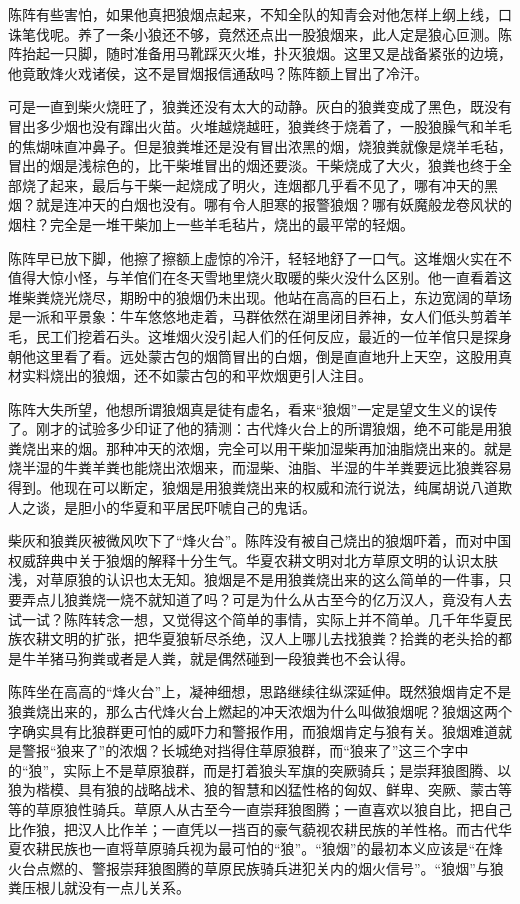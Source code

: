 \par 陈阵有些害怕，如果他真把狼烟点起来，不知全队的知青会对他怎样上纲上线，口诛笔伐呢。养了一条小狼还不够，竟然还点出一股狼烟来，此人定是狼心叵测。陈阵抬起一只脚，随时准备用马靴踩灭火堆，扑灭狼烟。这里又是战备紧张的边境，他竟敢烽火戏诸侯，这不是冒烟报信通敌吗？陈阵额上冒出了冷汗。
\par 可是一直到柴火烧旺了，狼粪还没有太大的动静。灰白的狼粪变成了黑色，既没有冒出多少烟也没有蹿出火苗。火堆越烧越旺，狼粪终于烧着了，一股狼臊气和羊毛的焦煳味直冲鼻子。但是狼粪堆还是没有冒出浓黑的烟，烧狼粪就像是烧羊毛毡，冒出的烟是浅棕色的，比干柴堆冒出的烟还要淡。干柴烧成了大火，狼粪也终于全部烧了起来，最后与干柴一起烧成了明火，连烟都几乎看不见了，哪有冲天的黑烟？就是连冲天的白烟也没有。哪有令人胆寒的报警狼烟？哪有妖魔般龙卷风状的烟柱？完全是一堆干柴加上一些羊毛毡片，烧出的最平常的轻烟。
\par 陈阵早已放下脚，他擦了擦额上虚惊的冷汗，轻轻地舒了一口气。这堆烟火实在不值得大惊小怪，与羊倌们在冬天雪地里烧火取暖的柴火没什么区别。他一直看着这堆柴粪烧光烧尽，期盼中的狼烟仍未出现。他站在高高的巨石上，东边宽阔的草场是一派和平景象：牛车悠悠地走着，马群依然在湖里闭目养神，女人们低头剪着羊毛，民工们挖着石头。这堆烟火没引起人们的任何反应，最近的一位羊倌只是探身朝他这里看了看。远处蒙古包的烟筒冒出的白烟，倒是直直地升上天空，这股用真材实料烧出的狼烟，还不如蒙古包的和平炊烟更引人注目。
\par 陈阵大失所望，他想所谓狼烟真是徒有虚名，看来“狼烟”一定是望文生义的误传了。刚才的试验多少印证了他的猜测：古代烽火台上的所谓狼烟，绝不可能是用狼粪烧出来的烟。那种冲天的浓烟，完全可以用干柴加湿柴再加油脂烧出来的。就是烧半湿的牛粪羊粪也能烧出浓烟来，而湿柴、油脂、半湿的牛羊粪要远比狼粪容易得到。他现在可以断定，狼烟是用狼粪烧出来的权威和流行说法，纯属胡说八道欺人之谈，是胆小的华夏和平居民吓唬自己的鬼话。
\par 柴灰和狼粪灰被微风吹下了“烽火台”。陈阵没有被自己烧出的狼烟吓着，而对中国权威辞典中关于狼烟的解释十分生气。华夏农耕文明对北方草原文明的认识太肤浅，对草原狼的认识也太无知。狼烟是不是用狼粪烧出来的这么简单的一件事，只要弄点儿狼粪烧一烧不就知道了吗？可是为什么从古至今的亿万汉人，竟没有人去试一试？陈阵转念一想，又觉得这个简单的事情，实际上并不简单。几千年华夏民族农耕文明的扩张，把华夏狼斩尽杀绝，汉人上哪儿去找狼粪？拾粪的老头拾的都是牛羊猪马狗粪或者是人粪，就是偶然碰到一段狼粪也不会认得。
\par 陈阵坐在高高的“烽火台”上，凝神细想，思路继续往纵深延伸。既然狼烟肯定不是狼粪烧出来的，那么古代烽火台上燃起的冲天浓烟为什么叫做狼烟呢？狼烟这两个字确实具有比狼群更可怕的威吓力和警报作用，而狼烟肯定与狼有关。狼烟难道就是警报“狼来了”的浓烟？长城绝对挡得住草原狼群，而“狼来了”这三个字中的“狼”，实际上不是草原狼群，而是打着狼头军旗的突厥骑兵；是崇拜狼图腾、以狼为楷模、具有狼的战略战术、狼的智慧和凶猛性格的匈奴、鲜卑、突厥、蒙古等等的草原狼性骑兵。草原人从古至今一直崇拜狼图腾；一直喜欢以狼自比，把自己比作狼，把汉人比作羊；一直凭以一挡百的豪气藐视农耕民族的羊性格。而古代华夏农耕民族也一直将草原骑兵视为最可怕的“狼”。“狼烟”的最初本义应该是“在烽火台点燃的、警报崇拜狼图腾的草原民族骑兵进犯关内的烟火信号”。“狼烟”与狼粪压根儿就没有一点儿关系。
